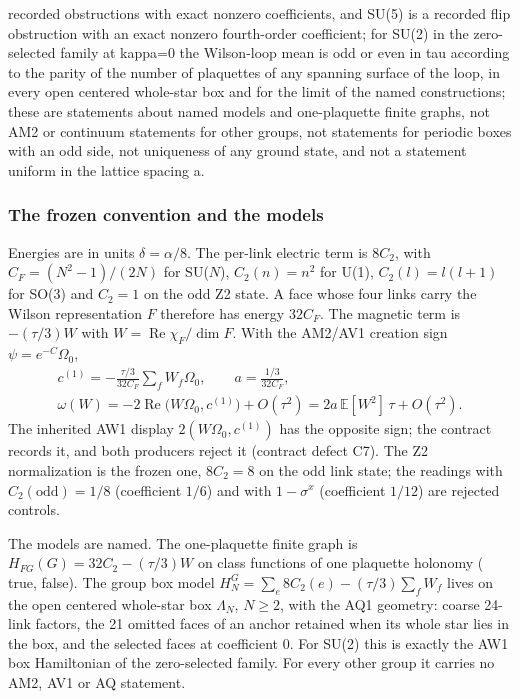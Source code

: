 \begin{gatequote}
recorded obstructions with exact nonzero coefficients, and SU(5) is a recorded
flip obstruction with an exact nonzero fourth-order coefficient; for SU(2) in
the zero-selected family at kappa=0 the Wilson-loop mean is odd or even in tau
according to the parity of the number of plaquettes of any spanning surface of
the loop, in every open centered whole-star box and for the limit of the named
constructions; these are statements about named models and one-plaquette
finite graphs, not AM2 or continuum statements for other groups, not
statements for periodic boxes with an odd side, not uniqueness of any ground
state, and not a statement uniform in the lattice spacing a.
\end{gatequote}

\subsubsection{The frozen convention and the models}
\label{sec:bd1-convention}
Energies are in units $\delta=\alpha/8$. The per-link electric term is
$8C_2$, with $C_F=(N^2-1)/(2N)$ for SU($N$), $C_2(n)=n^2$ for U(1),
$C_2(l)=l(l+1)$ for SO(3) and $C_2=1$ on the odd Z2 state. A face whose four
links carry the Wilson representation $F$ therefore has energy $32C_F$. The
magnetic term is $-(\tau/3)W$ with $W=\operatorname{Re}\chi_F/\dim F$. With the
AM2/AV1 creation sign $\psi=e^{-C}\Omega_0$,
\begin{equation}
 \begin{gathered}
 c^{(1)}=-\frac{\tau/3}{32C_F}\sum_fW_f\Omega_0,\qquad a=\frac{1/3}{32C_F},\\
 \omega(W)=-2\operatorname{Re}\bigl(W\Omega_0,c^{(1)}\bigr)+O(\tau^2)
 =2a\,\mathbb E[W^2]\,\tau+O(\tau^2).
 \end{gathered}
 \label{eq:bd1-first-order}
\end{equation}
The inherited AW1 display $2(W\Omega_0,c^{(1)})$ has the opposite sign; the
contract records it, and both producers reject it (contract defect C7). The
Z2 normalization is the frozen one, $8C_2=8$ on the odd link state; the
readings with $C_2(\mathrm{odd})=1/8$ (coefficient $1/6$) and with
$1-\sigma^x$ (coefficient $1/12$) are rejected controls.

The models are named. The one-plaquette finite graph is
$H_{FG}(G)=32C_2-(\tau/3)W$ on class functions of one plaquette holonomy
( true,  false). The
group box model $H^G_N=\sum_e8C_2(e)-(\tau/3)\sum_fW_f$ lives on the open
centered whole-star box $\Lambda_N$, $N\ge2$, with the AQ1 geometry: coarse
24-link factors, the 21 omitted faces of an anchor retained when its whole
star lies in the box, and the selected faces at coefficient 0. For SU(2)
this is exactly the AW1 box Hamiltonian of the zero-selected family. For
every other group it carries no AM2, AV1 or AQ statement.

